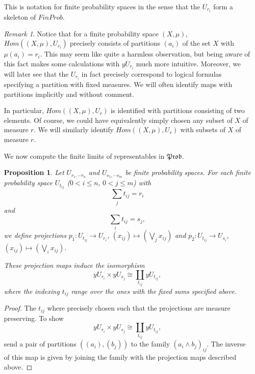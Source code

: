 \documentclass[a4paper]{amsproc}
\theoremstyle{plain}
\newtheorem{proposition}[theorem]{Proposition}
\theoremstyle{definition}
\theoremstyle{remark}
\newtheorem{remark}[theorem]{Remark}
\numberwithin{equation}{section}
\begin{document}
This is notation for finite probability spaces in the sense that the $U_{r_i}$ form a skeleton of $FinProb$.

\begin{remark}\label{classifying_partitions}
    Notice that for a finite probability space $(X,\mu)$, $Hom((X,\mu), U_{r_i})$ precisely consists of partitions $(a_i)$ of the set $X$ with $\mu(a_i) = r_i$. This may seem like quite a harmless observation, but being aware of this fact makes some calculations with $y U_{r_i}$ much more intuitive. Moreover, we will later see that the $U_{r_i}$ in fact precisely correspond to logical formulas specifying a partition with fixed measures. We will often identify maps with partitions implicitly and without comment.

    In particular, $Hom((X,\mu), U_r)$ is identified with partitions consisting of two elements. Of course, we could have equivalently simply chosen any subset of $X$ of measure $r$. We will similarly identify $Hom((X,\mu), U_r)$ with subsets of $X$ of measure $r$.

\end{remark}

We now compute the finite limits of representables in $\mathfrak{Prob}$.

\begin{proposition} \label{multiproduct}
    Let $U_{r_1, \cdots r_n}$ and $U_{s_1, \cdots s_m}$ be finite probability spaces. For each finite probability space $U_{t_{ij}}$ ($0 < i \leq n$, $0 < j \leq m$) with
    \[
        \sum_j t_{ij} = r_i
    \]
    and
    \[
        \sum_i t_{ij} = s_j ,
    \]
    we define projections $p_1: U_{t_{ij}} \to U_{r_i}$, $(x_{ij}) \mapsto (\bigvee_j x_{ij})$ and $p_2: U_{t_{ij}} \to U_{s_i}$, $(x_{ij}) \mapsto (\bigvee_i x_{ij})$.

    These projection maps induce the isomorphism
    \[
    y U_{r_i} \times y U_{s_j} \cong \coprod_{t_{ij}} y U_{t_{ij}} ,
    \]
    where the indexing $t_{ij}$ range over the ones with the fixed sums specified above.
\end{proposition}
\begin{proof}
    The $t_{ij}$ where precisely chosen such that the projections are measure preserving. To show
    \[
    y U_{r_i} \times y U_{s_j} \cong \coprod_{t_{ij}} y U_{t_{ij}} ,
    \]
    send a pair of partitions $((a_i),(b_j))$ to the family $(a_i \wedge b_j)_{ij}$. The inverse of this map is given by joining the family with the projection maps described above.
\end{proof}
    
\end{document}
